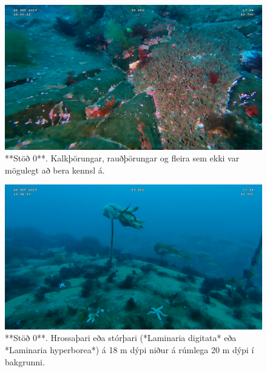 \documentclass[icelandic,]{book}
\begin{document}
\begin{figure}

{\centering \includegraphics[width=1\linewidth]{skjol/skogar/sk6/stodvar/st1/sk6-st1} 

}

\caption{**Stöð 0**. Kalkþörungar, rauðþörungar og fleira sem ekki var mögulegt að bera kennsl á.}\label{fig:mynd-sk-sex-stod-eitt}
\end{figure}

\begin{figure}

{\centering \includegraphics[width=1\linewidth]{skjol/skogar/sk6/stodvar/st1/sk6-st1B} 

}

\caption{**Stöð 0**. Hrossaþari eða stórþari (*Laminaria digitata* eða *Laminaria hyperborea*) á 18 m dýpi niður á rúmlega 20 m dýpi í bakgrunni.}\label{fig:mynd-sk-sex-stod-eittB}
\end{figure}
\end{document}
